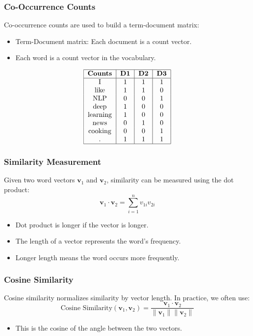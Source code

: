 \documentclass{beamer}
\begin{document}
\begin{frame}
\frametitle{Co-Occurrence Counts}
Co-occurrence counts are used to build a term-document matrix:
\begin{itemize}
    \item Term-Document matrix: Each document is a count vector.
    \item Each word is a count vector in the vocabulary.
\end{itemize}
\[
\begin{tabular}{|c|c|c|c|}
\hline
\textbf{Counts} & \textbf{D1} & \textbf{D2} & \textbf{D3} \\
\hline
I & 1 & 1 & 1 \\
like & 1 & 1 & 0 \\
NLP & 0 & 0 & 1 \\
deep & 1 & 0 & 0 \\
learning & 1 & 0 & 0 \\
news & 0 & 1 & 0 \\
cooking & 0 & 0 & 1 \\
. & 1 & 1 & 1 \\
\hline
\end{tabular}
\]
\end{frame}

\begin{frame}
\frametitle{Similarity Measurement}
Given two word vectors \( \mathbf{v}_1 \) and \( \mathbf{v}_2 \), similarity can be measured using the dot product:
\[
\mathbf{v}_1 \cdot \mathbf{v}_2 = \sum_{i=1}^{n} v_{1i} v_{2i}
\]
\begin{itemize}
    \item Dot product is longer if the vector is longer.
    \item The length of a vector represents the word's frequency.
    \item Longer length means the word occurs more frequently.
\end{itemize}
\end{frame}

\begin{frame}
\frametitle{Cosine Similarity}
Cosine similarity normalizes similarity by vector length. In practice, we often use:
\[
\text{Cosine Similarity}(\mathbf{v}_1, \mathbf{v}_2) = \frac{\mathbf{v}_1 \cdot \mathbf{v}_2}{\|\mathbf{v}_1\| \|\mathbf{v}_2\|}
\]
\begin{itemize}
    \item This is the cosine of the angle between the two vectors.
\end{itemize}
\end{frame}
\end{document}

